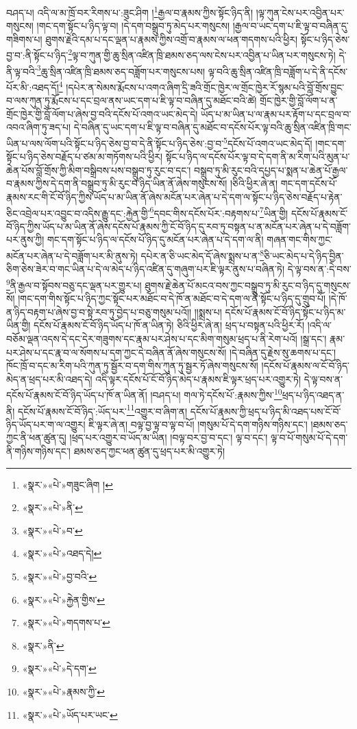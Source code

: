 བཤད་པ། འདི་ལ་མ་ཁྲོ་བར་རིགས་པ་:ཟུང་ཤིག །\footnote{«སྣར་»«པེ་»གཟུང་ཞིག །}རྒྱལ་བ་རྣམས་ཀྱིས་སྟོང་ཉིད་ནི། །ལྟ་ཀུན་ངེས་པར་འབྱིན་པར་གསུངས། །གང་དག་སྟོང་པ་ཉིད་ལྟ་བ། །དེ་དག་བསྒྲུབ་ཏུ་མེད་པར་གསུངས། །རྒྱལ་བ་ཡང་དག་པ་ཇི་ལྟ་བ་བཞིན་དུ་གཟིགས་པ། ཐུགས་རྗེའི་དམ་པ་དང་ལྡན་པ་རྣམས་ཀྱིས་འགྲོ་བ་རྣམས་ལ་ཕན་གདགས་པའི་ཕྱིར། སྟོང་པ་ཉིད་ཅེས་བྱ་བ་:ནི་སྟོང་པ་ཉིད་\footnote{«སྣར་»«པེ་»ནི་}ལྟ་བ་ཀུན་གྱི་ཆུ་སྲིན་འཛིན་ཁྲི་ཐམས་ཅད་ལས་ངེས་པར་འབྱིན་པ་ཡིན་པར་གསུངས་ཏེ། དེ་ནི་ལྟ་བའི་\footnote{«སྣར་»«པེ་»བ་}ཆུ་སྲིན་འཛིན་ཁྲི་ཐམས་ཅད་བཟློག་པར་གསུངས་པས། ལྟ་བའི་ཆུ་སྲིན་འཛིན་ཁྲི་བཟློག་པ་དེ་ནི་དངོས་པོར་མི་:འཐད་དོ།\footnote{«སྣར་»«པེ་»འཐད་དེ།} །དཔེར་ན་སེམས་རྨོངས་པ་འགའ་ཞིག་དྲི་ཟའི་གྲོང་ཁྱེར་ལ་གྲོང་ཁྱེར་རོ་སྙམ་པའི་བློ་གྲོས་བྱུང་བ་ལས་ཀུན་ཏུ་རྨོངས་པ་དང་བྲལ་ནས་ཡང་དག་པ་ཇི་ལྟ་བ་བཞིན་དུ་མཐོང་བའི་ཚེ། གྲོང་ཁྱེར་གྱི་བློ་ལོག་པ་ན་གྲོང་ཁྱེར་གྱི་བློ་ལོག་པ་ཞེས་བྱ་བའི་དངོས་པོ་འགའ་ཡང་མེད་དེ། ཡོད་པ་མ་ཡིན་པ་ལ་རྣམ་པར་རྟོག་པ་དང་བྲལ་བ་འབའ་ཞིག་ཏུ་ཟད་པ། དེ་བཞིན་དུ་ཡང་དག་པ་ཇི་ལྟ་བ་བཞིན་དུ་མཐོང་བ་དངོས་པོར་ལྟ་བའི་ཆུ་སྲིན་འཛིན་ཁྲི་གང་ཡིན་པ་ལས་ལོག་པའི་སྟོང་པ་ཉིད་ཅེས་བྱ་བ་དེ་ནི་སྟོང་པ་ཉིད་ཅེས་:བྱ་བ་\footnote{«སྣར་»«པེ་»བྱ་བའི་}དངོས་པོ་འགའ་ཡང་མེད་དོ། །གང་དག་སྟོང་པ་ཉིད་ཅེས་བརྗོད་པ་ཙམ་མ་གཏོགས་པའི་ཕྱིར། སྟོང་པ་ཉིད་ལ་དངོས་པོར་ལྟ་བ་དེ་དག་ནི་མ་རིག་པའི་མུན་པ་ཆེན་པོས་བློ་གྲོས་ཀྱི་མིག་བསྒྲིབས་པས་བསྒྲུབ་ཏུ་རུང་བ་དང་། བསྒྲུབ་ཏུ་མི་རུང་བའི་དཔྱད་པ་སྨན་པ་ཆེན་པོ་རྒྱལ་བ་རྣམས་ཀྱིས་དེ་དག་ནི་བསྒྲུབ་ཏུ་མི་རུང་བ་ཉིད་ཡིན་ནོ་ཞེས་གསུངས་སོ། །ཅིའི་ཕྱིར་ཞེ་ན། གང་དག་དངོས་པོ་རྣམས་རང་གི་ངོ་བོ་ཉིད་ཀྱིས་ཡོད་པ་མ་ཡིན་ནོ་ཞེས་མངོན་པར་ཞེན་པ་དེ་དག་ལ་སྟོང་པ་ཉིད་ཅེས་བརྗོད་པ་རྟེན་ཅིང་འབྲེལ་པར་འབྱུང་བ་འདིས་རྒྱུ་དང་:རྐྱེན་གྱི་\footnote{«སྣར་»«པེ་»རྐྱེན་གྱིས་}དབང་གིས་དངོས་པོར་:བརྟགས་པ་\footnote{«སྣར་»«པེ་»གདགས་པ་}ཡིན་གྱི། དངོས་པོ་རྣམས་ངོ་བོ་ཉིད་ཀྱིས་ཡོད་པ་མ་ཡིན་ནོ་ཞེས་དངོས་པོ་རྣམས་ཀྱི་ངོ་བོ་ཉིད་དུ་རབ་ཏུ་བསྟན་པ་ན་མངོན་པར་ཞེན་པ་དེ་བཟློག་པར་ནུས་ཀྱི། གང་དག་སྟོང་པ་ཉིད་ལ་དངོས་པོ་ཉིད་དུ་མངོན་པར་ཞེན་པ་དེ་དག་ལ་ནི། གཞན་གང་གིས་ཀྱང་མངོན་པར་ཞེན་པ་དེ་བཟློག་པར་མི་ནུས་ཏེ། དཔེར་ན་ཅི་ཡང་མེད་དོ་ཞེས་སྨྲས་པ་ན་\footnote{«སྣར་»ནི་}ཅི་ཡང་མེད་པ་དེ་ཉིད་བྱིན་ཅིག་ཅེས་ཟེར་བ་གང་ཡིན་པ་དེ་ལ་མེད་པ་ཉིད་འཛིན་དུ་གཞུག་པར་ཇི་ལྟར་ནུས་པ་བཞིན་ཏེ། དེ་ལྟ་བས་ན་:དེ་བས་\footnote{«སྣར་»«པེ་»དེ་དག་}ནི་རྒྱལ་བ་སྟོབས་བཅུ་དང་ལྡན་པར་གྱུར་པ། ཐུགས་རྗེ་ཆེན་པོ་མངའ་བས་ཀྱང་བསྒྲུབ་ཏུ་མི་རུང་བ་ཉིད་དུ་གསུངས་སོ། །གང་དག་གིས་སྟོང་པ་ཉིད་ཀྱང་སྟོང་པར་མཐོང་བ་དེ་ཁོ་ན་མཐོང་བ་དེ་དག་ལ་ནི་སྟོང་པ་ཉིད་དུ་གྲུབ་པོ། །དེ་ཁོ་ན་ཉིད་བརྟག་པ་ཞེས་བྱ་བ་སྟེ་རབ་ཏུ་བྱེད་པ་བཅུ་གསུམ་པའོ།། །།སྨྲས་པ། དངོས་པོ་རྣམས་ངོ་བོ་ཉིད་སྟོང་པ་ཉིད་མ་ཡིན་གྱི། དངོས་པོ་རྣམས་ངོ་བོ་ཉིད་ཡོད་པ་ཁོ་ན་ཡིན་ཏེ། ཅིའི་ཕྱིར་ཞེ་ན། ཕྲད་པ་བསྟན་པའི་ཕྱིར་རོ། །འདི་ལ་བཅོམ་ལྡན་འདས་དེ་དང་དེར་གཟུགས་དང་རྣམ་པར་ཤེས་པ་དང་མིག་གསུམ་ཕྲད་པ་ནི་རེག་པའོ། །སྒྲ་དང་། རྣམ་པར་ཤེས་པ་དང་རྣ་བ་ལ་སོགས་པ་དག་ཀྱང་དེ་བཞིན་ནོ་ཞེས་གསུངས་སོ། །དེ་བཞིན་དུ་རྗེས་སུ་ཆགས་པ་དང་། ཁོང་ཁྲོ་བ་དང་མ་རིག་པའི་ཀུན་ཏུ་སྦྱོར་བ་དག་གིས་ཀུན་ཏུ་སྦྱར་ཏོ་ཞེས་གསུངས་སོ། །དངོས་པོ་རྣམས་ལ་ངོ་བོ་ཉིད་མེད་ན་ཕྲད་པར་མི་འཐད་དེ། འདི་ལྟར་དངོས་པོ་ངོ་བོ་ཉིད་མེད་པ་རྣམས་ཇི་ལྟར་ཕྲད་པར་འགྱུར་ཏེ། དེ་ལྟ་བས་ན་དངོས་པོ་རྣམས་ངོ་བོ་ཉིད་ཡོད་པ་ཁོ་ན་ཡིན་ནོ། །བཤད་པ། གལ་ཏེ་དངོས་པོ་:རྣམས་ཀྱིས་\footnote{«སྣར་»«པེ་»རྣམས་ཀྱི་}ཕྲད་པ་ཉིད་འཐད་ན་ནི། དངོས་པོ་རྣམས་ངོ་བོ་ཉིད་:ཡོད་པར་\footnote{«སྣར་»«པེ་»ཡོད་པར་ཡང་}འགྱུར་བ་ཞིག་ན། དངོས་པོ་རྣམས་ཀྱི་ཕྲད་པ་ཉིད་མི་འཐད་པས་ངོ་བོ་ཉིད་ཡོད་པར་ག་ལ་འགྱུར། ཇི་ལྟར་ཞེ་ན། བལྟ་བྱ་ལྟ་བ་ལྟ་བ་པོ། །གསུམ་པོ་དེ་དག་གཉིས་གཉིས་དང་། །ཐམས་ཅད་ཀྱང་ནི་ཕན་ཚུན་དུ། །ཕྲད་པར་འགྱུར་བ་ཡོད་མ་ཡིན། །བལྟ་བར་བྱ་བ་དང་། ལྟ་བ་དང་། ལྟ་བ་པོ་གསུམ་པོ་དེ་དག་ནི་གཉིས་གཉིས་དང་། ཐམས་ཅད་ཀྱང་ཕན་ཚུན་དུ་ཕྲད་པར་མི་འགྱུར་ཏེ། 